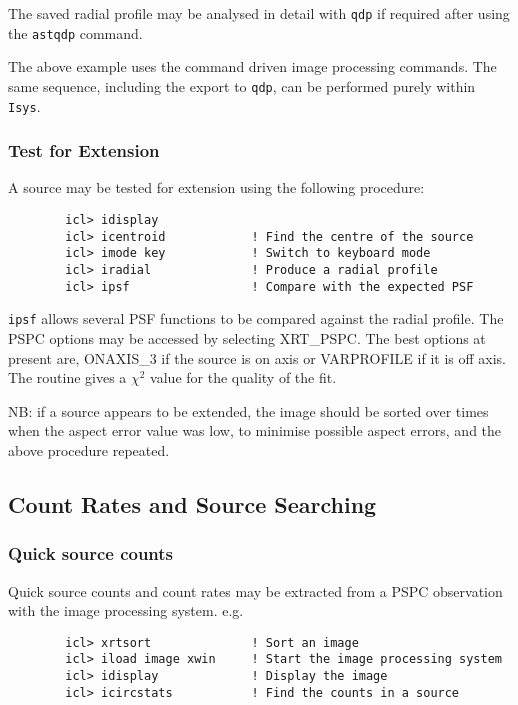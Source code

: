 \documentclass[11pt,fleqn]{article}    %
\begin{document}
The saved radial profile may be analysed in detail with {\tt qdp}
if required after using the {\tt astqdp} command.

The above example uses the command driven image processing commands.
The same sequence, including the export to {\tt qdp}, can be performed
purely within {\tt Isys}.

\subsubsection{Test for Extension}
A source may be tested for extension using the following procedure:

\begin{verbatim}
        icl> idisplay
        icl> icentroid            ! Find the centre of the source 
        icl> imode key            ! Switch to keyboard mode 
        icl> iradial              ! Produce a radial profile 
        icl> ipsf                 ! Compare with the expected PSF 
\end{verbatim}

{\tt ipsf} allows several PSF functions to be compared against the 
radial profile. The PSPC options may be accessed by selecting XRT\_PSPC.
The best options at present are, ONAXIS\_3 if the source is on
axis or VARPROFILE if it is off axis. The routine gives a $\chi^{2}$
value for the quality of the fit.

NB: if a source appears to be extended, the image should be
sorted over times when the aspect error value was low, to minimise 
possible aspect errors, and the above procedure repeated.

\subsection{Count Rates and Source Searching}

\subsubsection{Quick source counts}
Quick source counts and count rates may be extracted from a PSPC
observation with the image processing system. e.g. 

\begin{verbatim}
        icl> xrtsort              ! Sort an image
        icl> iload image xwin     ! Start the image processing system
        icl> idisplay             ! Display the image 
        icl> icircstats           ! Find the counts in a source
\end{verbatim}
\end{document}
